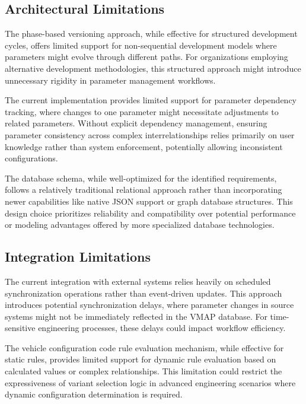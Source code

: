 \subsection{Architectural Limitations}
\label{subsec:architectural-limitations}

The phase-based versioning approach, while effective for structured development cycles, offers limited support for non-sequential development models where parameters might evolve through different paths. For organizations employing alternative development methodologies, this structured approach might introduce unnecessary rigidity in parameter management workflows.

The current implementation provides limited support for parameter dependency tracking, where changes to one parameter might necessitate adjustments to related parameters. Without explicit dependency management, ensuring parameter consistency across complex interrelationships relies primarily on user knowledge rather than system enforcement, potentially allowing inconsistent configurations.

The database schema, while well-optimized for the identified requirements, follows a relatively traditional relational approach rather than incorporating newer capabilities like native JSON support or graph database structures. This design choice prioritizes reliability and compatibility over potential performance or modeling advantages offered by more specialized database technologies.

\subsection{Integration Limitations}
\label{subsec:integration-limitations}

The current integration with external systems relies heavily on scheduled synchronization operations rather than event-driven updates. This approach introduces potential synchronization delays, where parameter changes in source systems might not be immediately reflected in the \ac{VMAP} database. For time-sensitive engineering processes, these delays could impact workflow efficiency.

The vehicle configuration code rule evaluation mechanism, while effective for static rules, provides limited support for dynamic rule evaluation based on calculated values or complex relationships. This limitation could restrict the expressiveness of variant selection logic in advanced engineering scenarios where dynamic configuration determination is required.

